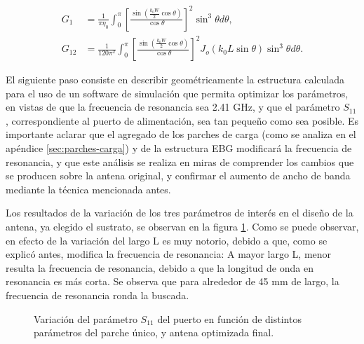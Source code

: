 \begin{align}
	\label{eq:conductancia-microstrip-balanis}
	G_1 &= \frac{1}{\pi \eta_0} \int_0^\pi \left[ \frac{\sin \left( \frac{k_0 W}{2} \cos \theta \right) }{\cos \theta}\right]^2 \sin^3 \theta d\theta, \\
	G_{12} &= \frac{1}{120 \pi^2} \int_0^{\pi} \left[ \frac{\sin \left( \frac{k_0 W}{2} \cos \theta \right) }{\cos \theta}\right]^2 J_o(k_0 L \sin \theta) \sin^3 \theta d\theta.
\end{align}

El siguiente paso consiste en describir geométricamente la estructura calculada para el uso de un software de simulación que permita optimizar los parámetros, en vistas de que la frecuencia de resonancia sea 2.41 GHz, y que el parámetro $S_{11}$, correspondiente al puerto de alimentación, sea tan pequeño como sea posible. Es importante aclarar que el agregado de los parches de carga (como se analiza en el apéndice \ref{sec:parches-carga}) y de la estructura EBG modificará la frecuencia de resonancia, y que este análisis se realiza en miras de comprender los cambios que se producen sobre la antena original, y confirmar el aumento de ancho de banda mediante la técnica mencionada antes.

Los resultados de la variación de los tres parámetros de interés en el diseño de la antena, ya elegido el sustrato, se observan en la figura \ref{fig:simulaciones-microstrip-1parche}. Como se puede observar, en efecto de la variación del largo L es muy notorio, debido a que, como se explicó antes, modifica la frecuencia de resonancia: A mayor largo L, menor resulta la frecuencia de resonancia, debido a que la longitud de onda en resonancia es más corta. Se observa que para alrededor de 45 mm de largo, la frecuencia de resonancia ronda la buscada.

\begin{figure}[H]
	\centering 
	\hspace{19pt}
	\caption{Variación del parámetro $S_{11}$ del puerto en función de distintos parámetros del parche único, y antena optimizada final.}
	\label{fig:simulaciones-microstrip-1parche}
\end{figure}

